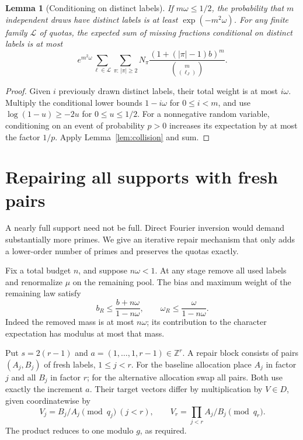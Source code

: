 \documentclass[11pt]{article}
\newtheorem{lemma}[theorem]{Lemma}
\theoremstyle{definition}\newtheorem{remark}[theorem]{Remark}
\begin{document}
\begin{lemma}[Conditioning on distinct labels]\label{lem:distinct}
If $m\omega\le1/2$, the probability that $m$ independent draws have distinct labels is at least $\exp(-m^2\omega)$. For any finite family $\mathcal L$ of quotas, the expected sum of missing fractions conditional on distinct labels is at most
\begin{equation}\label{eq:distinct}
 e^{m^2\omega}\sum_{\ell\in\mathcal L}\sum_{\pi:\,|\pi|\ge2}
 N_\pi\frac{(1+(|\pi|-1)b)^m}{\binom m{(\ell_J)}}.
\end{equation}
\end{lemma}
\begin{proof}
Given $i$ previously drawn distinct labels, their total weight is at most $i\omega$. Multiply the conditional lower bounds $1-i\omega$ for $0\le i<m$, and use $\log(1-u)\ge-2u$ for $0\le u\le1/2$. For a nonnegative random variable, conditioning on an event of probability $p>0$ increases its expectation by at most the factor $1/p$. Apply Lemma~\ref{lem:collision} and sum.
\end{proof}

\section{Repairing all supports with fresh pairs}\label{sec:repair}
A nearly full support need not be full. Direct Fourier inversion would demand substantially more primes. We give an iterative repair mechanism that only adds a lower-order number of primes and preserves the quotas exactly.

Fix a total budget $n$, and suppose $n\omega<1$. At any stage remove all used labels and renormalize $\mu$ on the remaining pool. The bias and maximum weight of the remaining law satisfy
\begin{equation}\label{eq:residual}
 b_R\le\frac{b+n\omega}{1-n\omega},\qquad \omega_R\le\frac{\omega}{1-n\omega}.
\end{equation}
Indeed the removed mass is at most $n\omega$; its contribution to the character expectation has modulus at most that mass.

Put $s=2(r-1)$ and $a=(1,\ldots,1,r-1)\in\mathbb Z^r$. A repair block consists of pairs $(A_j,B_j)$ of fresh labels, $1\le j<r$. For the baseline allocation place $A_j$ in factor $j$ and all $B_j$ in factor $r$; for the alternative allocation swap all pairs. Both use exactly the increment $a$. Their target vectors differ by multiplication by $V\in D$, given coordinatewise by
\begin{equation}\label{eq:shift}
 V_j=B_j/A_j\pmod{q_j}\ (j<r),\qquad
 V_r=\prod_{j<r} A_j/B_j\pmod{q_r}.
\end{equation}
The product reduces to one modulo $g$, as required.
\end{document}
